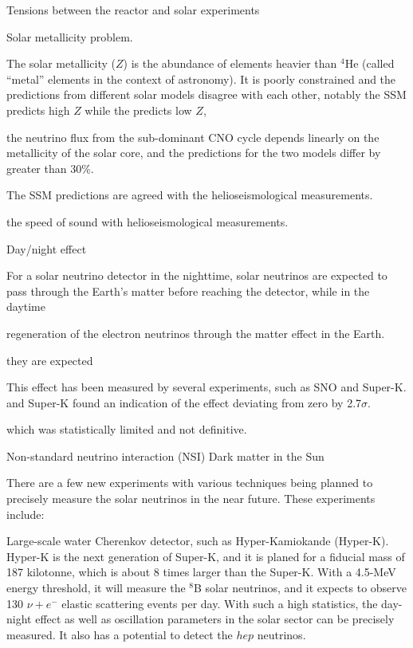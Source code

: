Tensions between the reactor and solar experiments
	
Solar metallicity problem.

The solar metallicity ($Z$) is the abundance of elements heavier than $^4$He (called ``metal'' elements in the context of astronomy). It is poorly constrained and the predictions from different solar models disagree with each other, notably the SSM predicts high $Z$ 
while the predicts low $Z$, \cite{vinyoles2017new}

 the neutrino flux from the sub-dominant CNO cycle depends linearly on the metallicity of the solar core,
and the predictions for the two models differ by greater than 30\%\cite{gann2015everything}. 
	
	The SSM predictions are agreed with the helioseismological measurements\cite{gann2015everything,oberauer2020solar}. 
	
	the speed of sound with helioseismological measurements. 
	
Day/night effect
	
	For a solar neutrino detector in the nighttime, solar neutrinos are expected to pass through the Earth's matter before reaching the detector, while in the daytime 
	
	regeneration of the electron neutrinos through the matter effect 
	in the Earth.
	
	   
	 they are expected 
	
	
	This effect has been measured by several experiments, such as SNO\cite{aharmim2013combined} and Super-K\cite{abe2016solar}.
	and Super-K found an indication of the effect deviating from zero by 2.7$\sigma$\cite{renshaw2014first}.
	
	which was
statistically limited and not definitive\cite{abe2016solar,suzuki2020sun}.
	
Non-standard neutrino interaction (NSI)     Dark matter in the Sun

There are a few new experiments with various techniques being planned to precisely measure the solar neutrinos in the near future. These experiments include:

Large-scale water Cherenkov detector, such as Hyper-Kamiokande (Hyper-K). Hyper-K is the next generation of Super-K, and it is planed for a fiducial mass of 187 kilotonne, which is about 8 times larger than the Super-K. With a 4.5-MeV energy threshold, it will measure the $^8$B solar neutrinos, and it expects to observe 130 $\nu+e^-$ elastic scattering events per day. With such a high statistics, the day-night effect as well as oscillation parameters in the solar sector can be precisely measured. It also has a potential to detect the $hep$ neutrinos\cite{yano2019solar}. 

